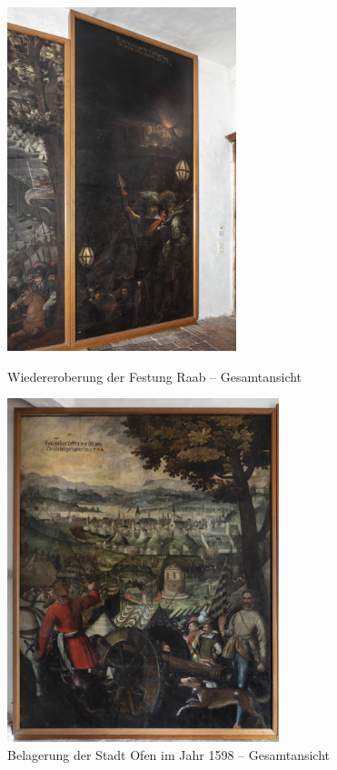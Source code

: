 \documentclass[
  a4paper,
]{book}
\begin{document}
\begin{figure}
\includegraphics[height=10cm]{images/fmd10005846a.jpg}

\caption{Wiedereroberung der Festung Raab – Gesamtansicht}
\label{fig:{images/fmd10005846a.jpg}}

\clearpage

\centering

\includegraphics[height=10cm]{images/fmd10005847a.jpg}

\caption{Belagerung der Stadt Ofen im Jahr 1598 – Gesamtansicht}
\label{fig:{images/fmd10005847a.jpg}}

\clearpage

\centering


\end{figure}
\end{document}
